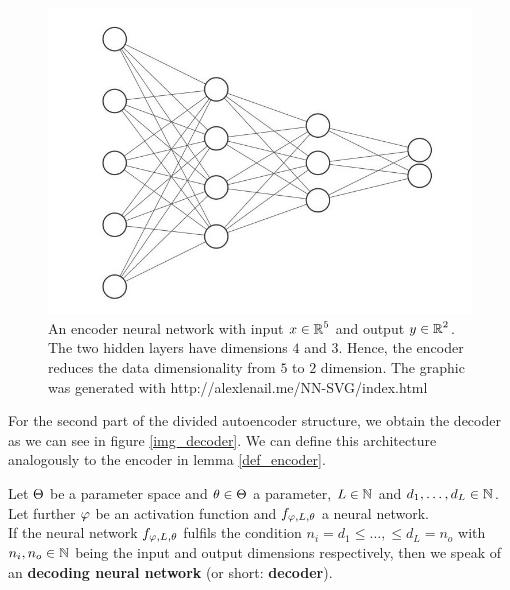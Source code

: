 \begin{figure}
\begin{center}
   \begin{minipage}[b]{0.9\linewidth}
      \includegraphics[width=\linewidth]{encoder}
      \caption{An encoder neural network with input $x\in \operatorname{\mathbb{R}}^5$ and output $y \in \operatorname{\mathbb{R}}^2$. The two hidden layers have dimensions $4$ and $3$. Hence, the encoder reduces the data dimensionality from $5$ to $2$ dimension. The graphic was generated with http://alexlenail.me/NN-SVG/index.html}\label{img_encoder}
	\end{minipage}
\end{center}
\end{figure}


For the second part of the divided autoencoder structure, we obtain the decoder as we can see in figure \ref{img_decoder}. We can define this architecture analogously to the encoder in lemma \ref{def_encoder}.


\begin{lemma}\label{def_decoder}
Let $\operatorname{\Theta}$ be a parameter space and $\theta \in \operatorname{\Theta}$ a parameter, $L\in \operatorname{\mathbb{N}}$ and $d_1,\ldots, d_L\in\operatorname{\mathbb{N}}$. Let further $\operatorname{\varphi}$ be an activation function and $f_{\operatorname{\varphi},L,\theta}$ a neural network.\\
If the neural network $f_{\operatorname{\varphi},L,\theta}$ fulfils the condition $n_i= d_1 \leq \ldots, \leq d_L = n_o$ with $n_i, n_o \in \operatorname{\mathbb{N}}$ being the input and output dimensions respectively, then we speak of an \textbf{decoding neural network} (or short: \textbf{decoder}).
\end{lemma}


